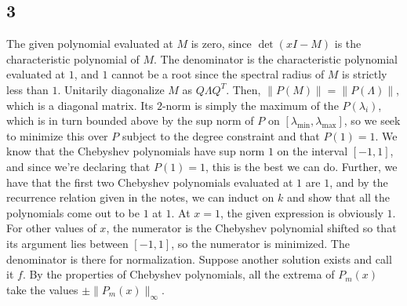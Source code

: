 \documentclass{article}
\begin{document}
\subsection*{3}
The given polynomial evaluated at $M$ is zero, since $\det(xI-M)$ is the characteristic polynomial of $M$. The denominator is the characteristic polynomial evaluated at $1$, and $1$ cannot be a root since the spectral radius of $M$ is strictly less than $1$.
Unitarily diagonalize $M$ as $Q\Lambda Q^T$. Then, $\|P(M)\|=\|P(\Lambda)\|$, which is a diagonal matrix. Its $2$-norm is simply the maximum of the $P(\lambda_i)$, which is in turn bounded above by the sup norm of $P$ on $[\lambda_\text{min},\lambda_\text{max}]$, so we seek to minimize this over $P$ subject to the degree constraint and that $P(1)=1$. 
We know that the Chebyshev polynomials have sup norm $1$ on the interval $[-1,1]$, and since we're declaring that $P(1)=1$, this is the best we can do. Further, we have that the first two Chebyshev polynomials evaluated at $1$ are $1$, and by the recurrence relation given in the notes, we can induct on $k$ and show that all the polynomials come out to be $1$ at $1$. 
At $x=1$, the given expression is obviously $1$. For other values of $x$, the numerator is the Chebyshev polynomial shifted so that its argument lies between $[-1,1]$, so the numerator is minimized. The denominator is there for normalization.
Suppose another solution exists and call it $f$. By the properties of Chebyshev polynomials, all the extrema of $P_m(x)$ take the values $\pm\|P_m(x)\|_\infty$. 
\end{document}
